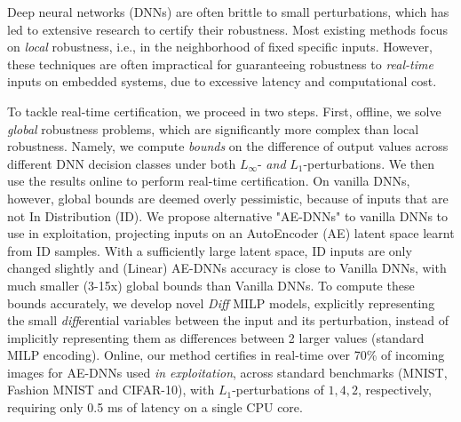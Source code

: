 Deep neural networks (DNNs) are often brittle to small perturbations, which has led to extensive research to certify their robustness. Most existing methods focus on {\em local} robustness, i.e., in the neighborhood of fixed specific inputs. However, these techniques are often impractical for guaranteeing robustness to {\em real-time} inputs on embedded systems, due to excessive latency and computational cost.

To tackle real-time certification, we proceed in two steps. First, offline, we solve {\em global} robustness problems, which are significantly more complex than local robustness. Namely, we compute {\em bounds} on the difference of output values across different DNN decision classes under both $L_\infty$- {\em and} $L_1$-perturbations. 
We then use the results online to perform real-time certification.
On vanilla DNNs, however, global bounds are deemed overly pessimistic, because of inputs that are not In Distribution (ID).
We propose alternative "AE-DNNs" to vanilla DNNs 
to use in exploitation, projecting  
inputs on an AutoEncoder (AE) latent space learnt from ID samples.
With a sufficiently large latent space, ID inputs are only changed slightly and (Linear) AE-DNNs accuracy is close to Vanilla DNNs, with much smaller (3-15x) global bounds than Vanilla DNNs.
To compute these bounds accurately, we develop novel {\em Diff} MILP models, explicitly representing the small {\em diff}erential variables between the input and its perturbation, instead of implicitly representing them as differences between 2 larger values (standard MILP encoding). 
Online, our method certifies in real-time over 70\% of incoming images 
for AE-DNNs used {\em in exploitation}, across standard benchmarks (MNIST, Fashion MNIST and CIFAR-10), with $L_1$-perturbations of $1, 4, 2$, respectively, requiring only 0.5 ms of latency on a single CPU core.